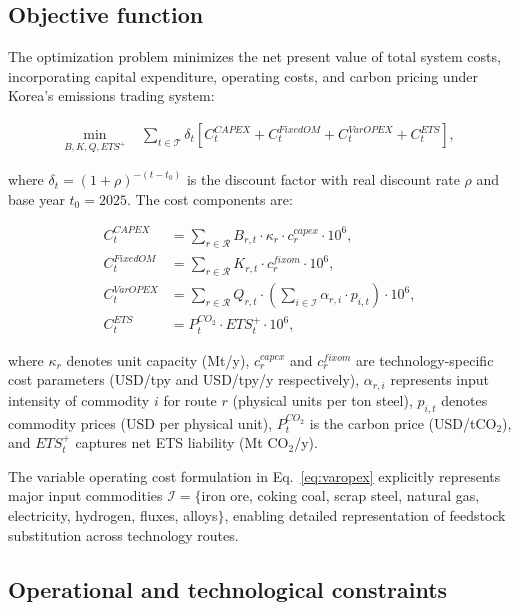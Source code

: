 \documentclass[preprint,5p,authoryear]{elsarticle}
\begin{document}
\subsection{Objective function}

The optimization problem minimizes the net present value of total system costs, incorporating capital expenditure, operating costs, and carbon pricing under Korea's emissions trading system:

\begin{align}
\min_{B,K,Q,ETS^+} \; & \sum_{t \in \mathcal{T}} \delta_t \left[ C^{CAPEX}_t + C^{FixedOM}_t + C^{VarOPEX}_t + C^{ETS}_t \right],
\end{align}

where $\delta_t = (1+\rho)^{-(t-t_0)}$ is the discount factor with real discount rate $\rho$ and base year $t_0 = 2025$. The cost components are:

\begin{align}
C^{CAPEX}_t &= \sum_{r \in \mathcal{R}} B_{r,t} \cdot \kappa_r \cdot c^{capex}_r \cdot 10^6, \label{eq:capex}\\
C^{FixedOM}_t &= \sum_{r \in \mathcal{R}} K_{r,t} \cdot c^{fixom}_r \cdot 10^6, \label{eq:fixom}\\
C^{VarOPEX}_t &= \sum_{r \in \mathcal{R}} Q_{r,t} \cdot \left( \sum_{i \in \mathcal{I}} \alpha_{r,i} \cdot p_{i,t} \right) \cdot 10^6, \label{eq:varopex}\\
C^{ETS}_t &= P^{CO_2}_t \cdot ETS_t^+ \cdot 10^6, \label{eq:ets}
\end{align}

where $\kappa_r$ denotes unit capacity (Mt/y), $c^{capex}_r$ and $c^{fixom}_r$ are technology-specific cost parameters (USD/tpy and USD/tpy/y respectively), $\alpha_{r,i}$ represents input intensity of commodity $i$ for route $r$ (physical units per ton steel), $p_{i,t}$ denotes commodity prices (USD per physical unit), $P^{CO_2}_t$ is the carbon price (USD/tCO$_2$), and $ETS_t^+$ captures net ETS liability (Mt CO$_2$/y).

The variable operating cost formulation in Eq.~\eqref{eq:varopex} explicitly represents major input commodities $\mathcal{I} = \{$iron ore, coking coal, scrap steel, natural gas, electricity, hydrogen, fluxes, alloys$\}$, enabling detailed representation of feedstock substitution across technology routes.

\subsection{Operational and technological constraints}
\end{document}
